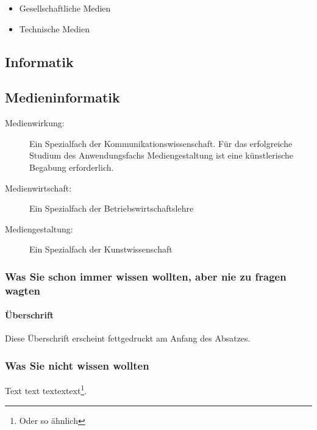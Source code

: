 \documentclass[11pt,a4paper,twoside]{article}
\begin{document}
\begin{itemize}
  \item Gesellschaftliche Medien
  \item Technische Medien
\end{itemize}


\subsection{Informatik}


\subsection{Medieninformatik}

\begin{description}
  \item[Medienwirkung:] Ein Spezialfach der Kommunikationswissenschaft. Für das erfolgreiche Studium des Anwendungsfachs Mediengestaltung ist eine künstlerische Begabung erforderlich.
  \item[Medienwirtschaft:] Ein Spezialfach der Betriebswirtschaftslehre
  \item[Mediengestaltung:] Ein Spezialfach der Kunstwissenschaft
\end{description}

\subsubsection{Was Sie schon immer wissen wollten, aber nie zu fragen
  wagten}

\paragraph{Überschrift}
Diese Überschrift erscheint fettgedruckt am Anfang des Absatzes.

\subsubsection{Was Sie nicht wissen wollten}

Text text textextext\footnote{Oder so ähnlich}.

\fi

\end{document}
